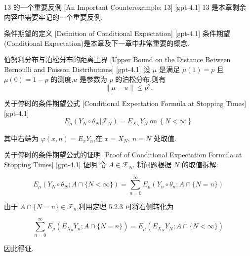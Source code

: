 \documentclass[UTF8]{ctexart}
\begin{document}
    
    
    \begin{cxmp}
        {13 的一个重要反例}
        [An Important Counterexample: 13]
        [gpt-4.1]
        13 是本章剩余内容中需要牢记的一个重要反例.
    \end{cxmp}
    
    
    
    \begin{dfn}
        {条件期望的定义}
        [Definition of Conditional Expectation]
        [gpt-4.1]
        条件期望(Conditional Expectation)是本章及下一章中非常重要的概念.
    \end{dfn}
    
    
    
    \begin{lma}
        {伯努利分布与泊松分布的距离上界}
        [Upper Bound on the Distance Between Bernoulli and Poisson Distributions]
        [gpt-4.1]
        设 $\mu$ 是满足 $\mu(1) = p$ 且 $\mu(0) = 1-p$ 的测度,$
u$ 是参数为 $p$ 的泊松分布,则有
\[
\| \mu - 
u \| \leq p^2.
\]

    \end{lma}
    
    
    
    \begin{thm}
        {关于停时的条件期望公式}
        [Conditional Expectation Formula at Stopping Times]
        [gpt-4.1]
        \[
E_{ \mu } ( Y_{ N } \circ \theta_{ N } | \mathcal{ F }_{ N } ) = E_{ X_{ N } } Y_{ N } \ \text{on} \ \left\{ N < \infty \right\}
\]

其中右端为 $\varphi ( x , n ) = E_{ x } Y_{ n }$,在 $x = X_{ N },\ n = N$ 处取值.

    \end{thm}
    
    
    
    \begin{prf}
        {关于停时的条件期望公式的证明}
        [Proof of Conditional Expectation Formula at Stopping Times]
        [gpt-4.1]
        证明 令 $A \in \mathcal{ F }_{ N }$.
将问题根据 $N$ 的取值拆解:

\[
E_{ \mu } ( Y_{ N } \circ \theta_{ N } ; A \cap \{ N < \infty \} ) = \sum_{ n = 0 }^{ \infty } E_{ \mu } ( Y_{ n } \circ \theta_{ n } ; A \cap \{ N = n \} )
\]

由于 $A \cap \{ N = n \} \in \mathcal{ F }_{ n }$,利用定理 5.2.3 可将右侧转化为

\[
\sum_{ n = 0 }^{ \infty } E_{ \mu } ( E_{ X_{ n } } Y_{ n } ; A \cap \{ N = n \} ) = E_{ \mu } ( E_{ X_{ N } } Y_{ N } ; A \cap \{ N < \infty \} )
\]

因此得证.

    \end{prf}
    
\end{document}

